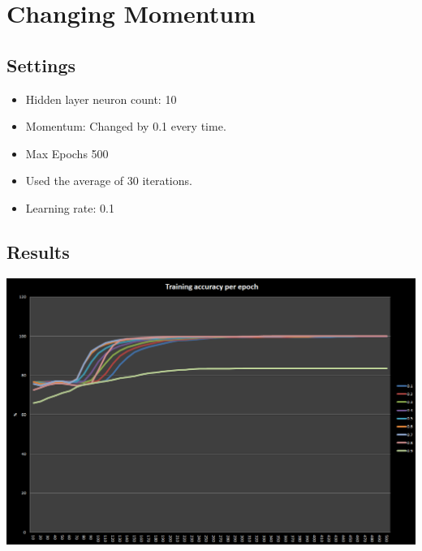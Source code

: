\documentclass[pdftex,10pt,a4paper]{report}
\begin{document}
\section{Changing Momentum}
\subsection{Settings}
\begin{itemize}
	\item Hidden layer neuron count: 10
	\item Momentum: Changed by 0.1 every time.
	\item Max Epochs 500
	\item Used the average of 30 iterations. 
	\item Learning rate: 0.1  
\end{itemize}
\subsection{Results}
\begin{center}
	\includegraphics[scale=0.5]{charts/other_1}
\end{center}
\end{document}
